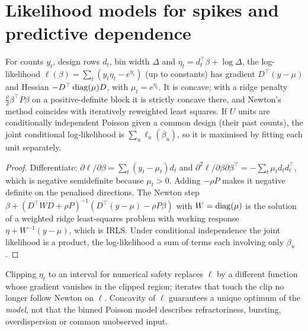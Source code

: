\section{Likelihood models for spikes and predictive dependence}
\begin{theorem}\label{ars:glm-001}
For counts $y_t$, design rows $d_t$, bin width $\Delta$ and $\eta_t=d_t^\top\beta+\log\Delta$, the log-likelihood $\ell(\beta)=\sum_t(y_t\eta_t-e^{\eta_t})$ (up to constants) has gradient $D^\top(y-\mu)$ and Hessian $-D^\top\operatorname{diag}(\mu)D$, with $\mu_t=e^{\eta_t}$. It is concave; with a ridge penalty $\frac\rho2\beta^\top P\beta$ on a positive-definite block it is strictly concave there, and Newton's method coincides with iteratively reweighted least squares. If $U$ units are conditionally independent Poisson given a common design (their past counts), the joint conditional log-likelihood is $\sum_u\ell_u(\beta_u)$, so it is maximised by fitting each unit separately.
\end{theorem}
\begin{proof}
Differentiate: $\partial\ell/\partial\beta=\sum_t(y_t-\mu_t)d_t$ and $\partial^2\ell/\partial\beta\partial\beta^\top=-\sum_t\mu_td_td_t^\top$, which is negative semidefinite because $\mu_t>0$. Adding $-\rho P$ makes it negative definite on the penalised directions. The Newton step $\beta+(D^\top WD+\rho P)^{-1}(D^\top(y-\mu)-\rho P\beta)$ with $W=\operatorname{diag}(\mu)$ is the solution of a weighted ridge least-squares problem with working response $\eta+W^{-1}(y-\mu)$, which is IRLS. Under conditional independence the joint likelihood is a product, the log-likelihood a sum of terms each involving only $\beta_u$.
\end{proof}
\begin{remark}
Clipping $\eta_t$ to an interval for numerical safety replaces $\ell$ by a different function whose gradient vanishes in the clipped region; iterates that touch the clip no longer follow Newton on $\ell$. Concavity of $\ell$ guarantees a unique optimum of the \emph{model}, not that the binned Poisson model describes refractoriness, bursting, overdispersion or common unobserved input.
\end{remark}

